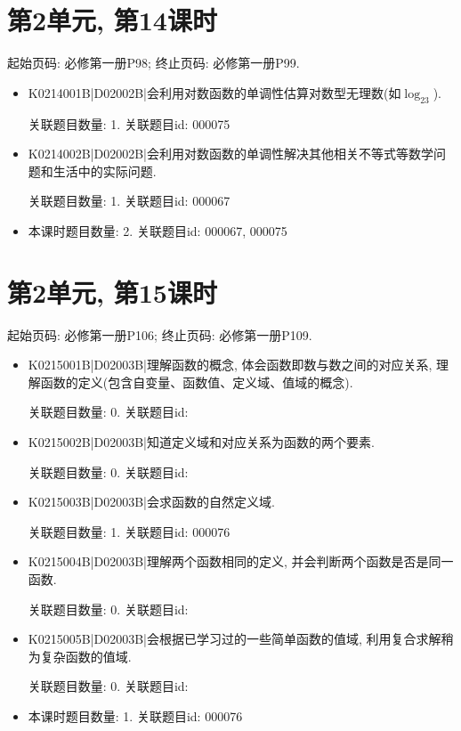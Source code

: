\section*{第2单元, 第14课时}
起始页码: 必修第一册P98; 终止页码: 必修第一册P99.
\begin{itemize}
\item K0214001B|D02002B|会利用对数函数的单调性估算对数型无理数(如$\log_23$).

关联题目数量: 1. 关联题目id: 000075

\item K0214002B|D02002B|会利用对数函数的单调性解决其他相关不等式等数学问题和生活中的实际问题.

关联题目数量: 1. 关联题目id: 000067

\item 本课时题目数量: 2. 关联题目id: 000067, 000075

\end{itemize}

\section*{第2单元, 第15课时}
起始页码: 必修第一册P106; 终止页码: 必修第一册P109.
\begin{itemize}
\item K0215001B|D02003B|理解函数的概念, 体会函数即数与数之间的对应关系, 理解函数的定义(包含自变量、函数值、定义域、值域的概念).

关联题目数量: 0. 关联题目id: 

\item K0215002B|D02003B|知道定义域和对应关系为函数的两个要素.

关联题目数量: 0. 关联题目id: 

\item K0215003B|D02003B|会求函数的自然定义域.

关联题目数量: 1. 关联题目id: 000076

\item K0215004B|D02003B|理解两个函数相同的定义, 并会判断两个函数是否是同一函数.

关联题目数量: 0. 关联题目id: 

\item K0215005B|D02003B|会根据已学习过的一些简单函数的值域, 利用复合求解稍为复杂函数的值域.

关联题目数量: 0. 关联题目id: 

\item 本课时题目数量: 1. 关联题目id: 000076

\end{itemize}

